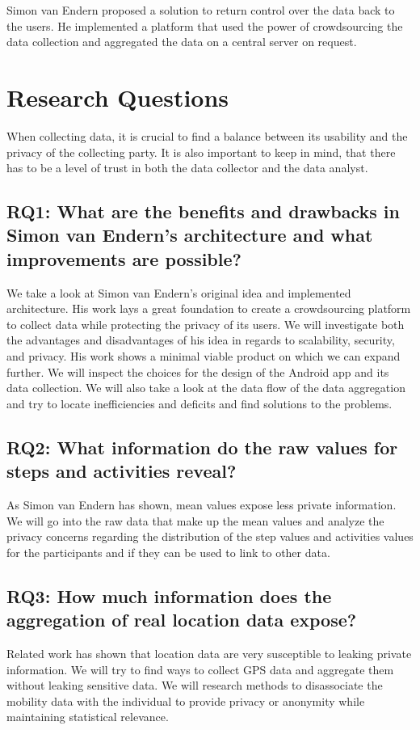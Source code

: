 Simon van Endern proposed a solution to return control over the data back to the users. He implemented a platform that used the power of crowdsourcing the data collection and aggregated the data on a central server on request.

\section{Research Questions}
When collecting data, it is crucial to find a balance between its usability and the privacy of the collecting party. It is also important to keep in mind, that there has to be a level of trust in both the data collector and the data analyst.
\subsection*{RQ1: What are the benefits and drawbacks in Simon van Endern's architecture and what improvements are possible?}
We take a look at Simon van Endern's original idea and implemented architecture. His work lays a great foundation to create a crowdsourcing platform to collect data while protecting the privacy of its users. We will investigate both the advantages and disadvantages of his idea in regards to scalability, security, and privacy. His work shows a minimal viable product on which we can expand further. We will inspect the choices for the design of the Android app and its data collection. We will also take a look at the data flow of the data aggregation and try to locate inefficiencies and deficits and find solutions to the problems.
\subsection*{RQ2: What information do the raw values for steps and activities reveal?}
As Simon van Endern has shown, mean values expose less private information. We will go into the raw data that make up the mean values and analyze the privacy concerns regarding the distribution of the step values and activities values for the participants and if they can be used to link to other data.
\subsection*{RQ3: How much information does the aggregation of real location data expose?}
Related work has shown that location data are very susceptible to leaking private information. We will try to find ways to collect GPS data and aggregate them without leaking sensitive data. We will research methods to disassociate the mobility data with the individual to provide privacy or anonymity while maintaining statistical relevance.
